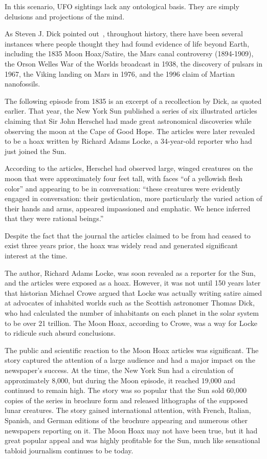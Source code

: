 In this scenario, UFO sightings lack any ontological basis. They are simply delusions and projections of the mind.

As Steven J. Dick pointed out~\cite[Chapter~3]{Dick2015}, throughout history, there have been several instances where people thought they had found evidence of life beyond Earth, including the 1835 Moon Hoax/Satire, the Mars canal controversy (1894-1909), the Orson Welles War of the Worlds broadcast in 1938, the discovery of pulsars in 1967, the Viking landing on Mars in 1976, and the 1996 claim of Martian nanofossils.

The following episode from 1835 is an excerpt of a recollection by Dick, as quoted earlier. That year, the New York Sun published a series of six illustrated articles claiming that Sir John Herschel had made great astronomical discoveries while observing the moon at the Cape of Good Hope. The articles were later revealed to be a hoax written by Richard Adams Locke, a 34-year-old reporter who had just joined the Sun.

According to the articles, Herschel had observed large, winged creatures on the moon that were approximately four feet tall, with faces ``of a yellowish flesh color'' and appearing to be in conversation: ``these creatures were evidently engaged in conversation: their gesticulation, more particularly the varied action of their hands and arms, appeared impassioned and emphatic. We hence inferred that they were rational beings.''

Despite the fact that the journal the articles claimed to be from had ceased to exist three years prior, the hoax was widely read and generated significant interest at the time.

The author, Richard Adams Locke, was soon revealed as a reporter for the Sun, and the articles were exposed as a hoax. However, it was not until 150 years later that historian Michael Crowe argued that Locke was actually writing satire aimed at advocates of inhabited worlds such as the Scottish astronomer Thomas Dick, who had calculated the number of inhabitants on each planet in the solar system to be over 21 trillion. The Moon Hoax, according to Crowe, was a way for Locke to ridicule such absurd conclusions.

The public and scientific reaction to the Moon Hoax articles was significant. The story captured the attention of a large audience and had a major impact on the newspaper's success. At the time, the New York Sun had a circulation of approximately 8,000, but during the Moon episode, it reached 19,000 and continued to remain high. The story was so popular that the Sun sold 60,000 copies of the series in brochure form and released lithographs of the supposed lunar creatures. The story gained international attention, with French, Italian, Spanish, and German editions of the brochure appearing and numerous other newspapers reporting on it. The Moon Hoax may not have been true, but it had great popular appeal and was highly profitable for the Sun, much like sensational tabloid journalism continues to be today.

